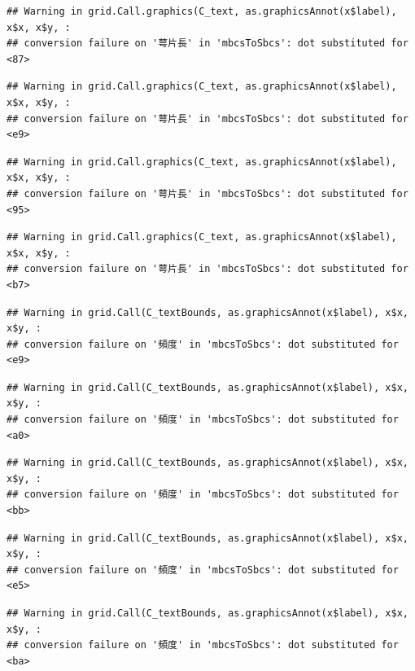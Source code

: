 \documentclass[
]{book}
\begin{document}
\begin{verbatim}
## Warning in grid.Call.graphics(C_text, as.graphicsAnnot(x$label), x$x, x$y, :
## conversion failure on '萼片長' in 'mbcsToSbcs': dot substituted for <87>
\end{verbatim}

\begin{verbatim}
## Warning in grid.Call.graphics(C_text, as.graphicsAnnot(x$label), x$x, x$y, :
## conversion failure on '萼片長' in 'mbcsToSbcs': dot substituted for <e9>
\end{verbatim}

\begin{verbatim}
## Warning in grid.Call.graphics(C_text, as.graphicsAnnot(x$label), x$x, x$y, :
## conversion failure on '萼片長' in 'mbcsToSbcs': dot substituted for <95>
\end{verbatim}

\begin{verbatim}
## Warning in grid.Call.graphics(C_text, as.graphicsAnnot(x$label), x$x, x$y, :
## conversion failure on '萼片長' in 'mbcsToSbcs': dot substituted for <b7>
\end{verbatim}

\begin{verbatim}
## Warning in grid.Call(C_textBounds, as.graphicsAnnot(x$label), x$x, x$y, :
## conversion failure on '頻度' in 'mbcsToSbcs': dot substituted for <e9>
\end{verbatim}

\begin{verbatim}
## Warning in grid.Call(C_textBounds, as.graphicsAnnot(x$label), x$x, x$y, :
## conversion failure on '頻度' in 'mbcsToSbcs': dot substituted for <a0>
\end{verbatim}

\begin{verbatim}
## Warning in grid.Call(C_textBounds, as.graphicsAnnot(x$label), x$x, x$y, :
## conversion failure on '頻度' in 'mbcsToSbcs': dot substituted for <bb>
\end{verbatim}

\begin{verbatim}
## Warning in grid.Call(C_textBounds, as.graphicsAnnot(x$label), x$x, x$y, :
## conversion failure on '頻度' in 'mbcsToSbcs': dot substituted for <e5>
\end{verbatim}

\begin{verbatim}
## Warning in grid.Call(C_textBounds, as.graphicsAnnot(x$label), x$x, x$y, :
## conversion failure on '頻度' in 'mbcsToSbcs': dot substituted for <ba>
\end{verbatim}
\end{document}
